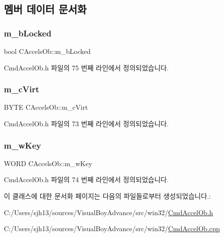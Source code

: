 \subsection{멤버 데이터 문서화}
\mbox{\label{class_c_accels_ob_ad8300bd20bd429ad61f89700e388dd9a}} 
\subsubsection{\texorpdfstring{m\+\_\+b\+Locked}{m\_bLocked}}
{\footnotesize\ttfamily bool C\+Accels\+Ob\+::m\+\_\+b\+Locked}



Cmd\+Accel\+Ob.\+h 파일의 75 번째 라인에서 정의되었습니다.

\mbox{\label{class_c_accels_ob_a08b7003ccf92c6afcf31878960d8eee1}} 
\subsubsection{\texorpdfstring{m\+\_\+c\+Virt}{m\_cVirt}}
{\footnotesize\ttfamily B\+Y\+TE C\+Accels\+Ob\+::m\+\_\+c\+Virt}



Cmd\+Accel\+Ob.\+h 파일의 73 번째 라인에서 정의되었습니다.

\mbox{\label{class_c_accels_ob_a1891250e9a4d00c0862f3a90a965d635}} 
\subsubsection{\texorpdfstring{m\+\_\+w\+Key}{m\_wKey}}
{\footnotesize\ttfamily W\+O\+RD C\+Accels\+Ob\+::m\+\_\+w\+Key}



Cmd\+Accel\+Ob.\+h 파일의 74 번째 라인에서 정의되었습니다.



이 클래스에 대한 문서화 페이지는 다음의 파일들로부터 생성되었습니다.\+:\begin{DoxyCompactItemize}
\item 
C\+:/\+Users/sjh13/sources/\+Visual\+Boy\+Advance/src/win32/\mbox{\hyperlink{_cmd_accel_ob_8h}{Cmd\+Accel\+Ob.\+h}}\item 
C\+:/\+Users/sjh13/sources/\+Visual\+Boy\+Advance/src/win32/\mbox{\hyperlink{_cmd_accel_ob_8cpp}{Cmd\+Accel\+Ob.\+cpp}}\end{DoxyCompactItemize}
